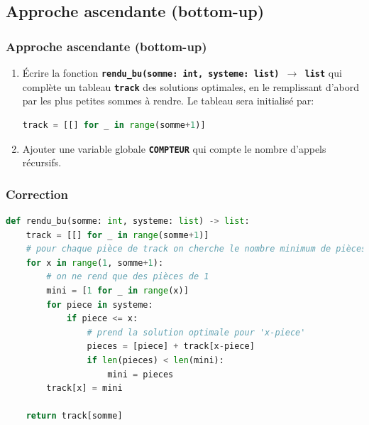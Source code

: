 \documentclass[svgnames,11pt]{beamer}
\begin{document}
\subsection{Approche ascendante (bottom-up)}
\begin{frame}[fragile]
    \frametitle{Approche ascendante (bottom-up)}

    \begin{activite}
        \begin{enumerate}
            \item Écrire la fonction \textbf{\texttt{rendu\_bu(somme: int, systeme: list) $\rightarrow$ list}} qui complète un tableau \textbf{\texttt{track}} des solutions optimales, en le remplissant d'abord par les plus petites sommes à rendre. Le tableau sera initialisé par:

\begin{lstlisting}[language=Python , basicstyle=\ttfamily\small, xleftmargin=2em, xrightmargin=2em]
track = [[] for _ in range(somme+1)]
\end{lstlisting}
            \item Ajouter une variable globale \textbf{\texttt{COMPTEUR}} qui compte le nombre d'appels récursifs.
        \end{enumerate}
    \end{activite}

\end{frame}
\begin{frame}[fragile]
    \frametitle{Correction}

\begin{center}
\begin{lstlisting}[language=Python , basicstyle=\ttfamily\small, xleftmargin=0.2em, xrightmargin=0em]
def rendu_bu(somme: int, systeme: list) -> list:
    track = [[] for _ in range(somme+1)]
    # pour chaque pièce de track on cherche le nombre minimum de pièces à rendre
    for x in range(1, somme+1):
        # on ne rend que des pièces de 1
        mini = [1 for _ in range(x)]
        for piece in systeme:
            if piece <= x:
                # prend la solution optimale pour 'x-piece'
                pieces = [piece] + track[x-piece]
                if len(pieces) < len(mini):
                    mini = pieces
        track[x] = mini

    return track[somme]
\end{lstlisting}
\end{center}  

\end{frame}
\end{document}
